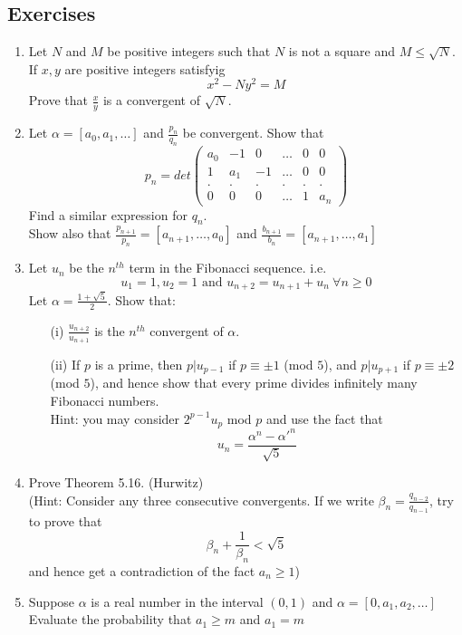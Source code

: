 \subsection{Exercises}
\begin{enumerate}
\item Let $N$ and $M$ be positive integers such that $N$ is not a square and $M \le \sqrt{N}$.
      If $x,y$ are positive integers satisfyig
      $$x^2-Ny^2=M$$
      Prove that $\frac{x}{y}$ is a convergent of $\sqrt{N}$.
\item Let $\alpha=[a_0,a_1,\ldots]$ and $\frac{p_n}{q_n}$ be convergent. Show that
      $$p_n=det \begin{pmatrix} a_0 &-1& 0& \ldots&0&0\\ 1&a_1& -1 &\ldots & 0 &0\\.&.&.&.&.&.\\
      0&0&0&\ldots&1&a_n \end{pmatrix}$$
      Find a similar expression for $q_n$.\\
      Show also that $\frac{p_{n+1}}{p_n}=[a_{n+1},\ldots,a_0]$ and
      $\frac{b_{n+1}}{b_n}=[a_{n+1},\ldots,a_1]$
\item Let $u_n$ be the $n^{th}$ term in the Fibonacci sequence. i.e.
     $$u_1=1,u_2=1 \text{ and }u_{n+2}=u_{n+1}+u_n~\forall n \ge 0$$ Let $\alpha=\frac{1+\sqrt{5}}{2}$.
     Show that:
     \begin{enumerate}
     \item[(i)]$\frac{u_{n+2}}{u_{n+1}}$ is the $n^{th}$ convergent of $\alpha$.
     \item[(ii)] If $p$ is a prime, then $p|u_{p-1}$ if $p \equiv \pm 1$ (mod $5$), and
     $p|u_{p+1}$ if $p \equiv \pm 2$ (mod $5$), and hence show that every prime divides
     infinitely many Fibonacci numbers.\\
     Hint: you may consider $2^{p-1}u_p$ mod $p$ and use the fact that
     $$u_n=\frac{\alpha^n-\alpha'^n}{\sqrt{5}}$$
     \end{enumerate}
\item Prove Theorem 5.16. (Hurwitz)\\
     (Hint: Consider any three consecutive convergents. If we write $\beta_n=\frac{q_{n-2}}{q_{n-1}}$, try to prove that
     $$\beta_n+\frac{1}{\beta_n} < \sqrt{5}$$
     and hence get a contradiction of the fact $a_n \ge 1$)
\item Suppose $\alpha$ is a real number in the interval $(0,1)$ and $\alpha=[0,a_1,a_2,\ldots]$
     Evaluate the probability that $a_1 \ge m$ and $a_1 = m$

\end{enumerate}
